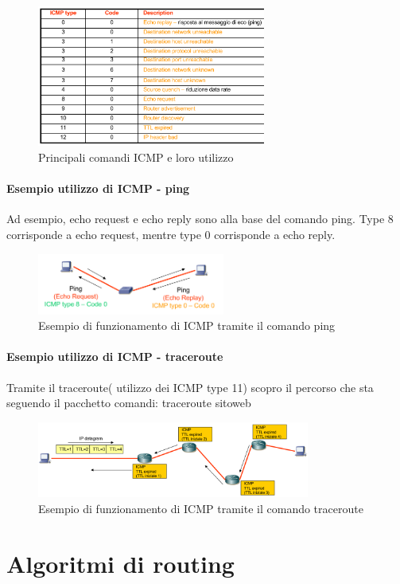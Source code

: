 \begin{figure}[h!]
    \centering
    \includegraphics[width=0.67\textwidth]{images/comandiicmp.png}
    \caption{Principali comandi ICMP e loro utilizzo}
    \label{fig:comandiicmp}
\end{figure}



\paragraph{Esempio utilizzo di ICMP - ping}
Ad esempio, echo request e echo reply sono alla base del comando ping.
Type 8 corrisponde a echo request, mentre type 0 corrisponde a echo reply. 

\begin{figure}[h!]
    \centering
    \includegraphics[width=0.55\textwidth]{images/pingicmp.png}
    \caption{Esempio di funzionamento di ICMP tramite il comando ping}
    \label{fig:pingicmp}
\end{figure}
\paragraph{Esempio utilizzo di ICMP - traceroute}
Tramite il traceroute( utilizzo dei ICMP type 11) scopro il percorso che sta seguendo il pacchetto 
comandi: traceroute sitoweb

\begin{figure}[h!]
    \centering
    \includegraphics[width=0.8\textwidth]{images/traceroute.png}
    \caption{Esempio di funzionamento di ICMP tramite il comando traceroute}
    \label{fig:traceroute}
\end{figure}
\newpage




\section{Algoritmi di routing}


